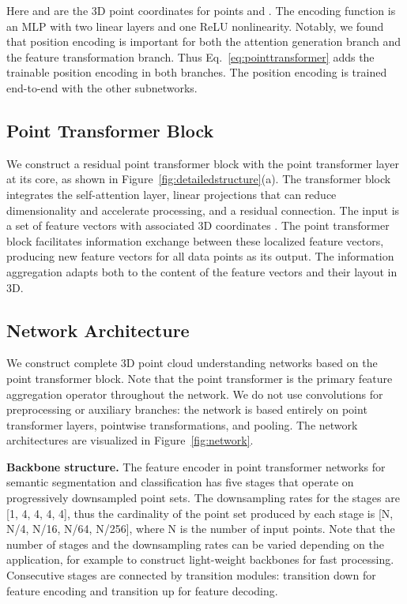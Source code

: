 \documentclass[final]{cvpr}
\newcommand\mypara[1]{\vspace{1mm}\noindent\textbf{#1}}
\begin{document}
Here  and  are the 3D point coordinates for points  and .
The encoding function  is an MLP with two linear layers and one ReLU nonlinearity.
Notably, we found that position encoding is important for both the attention generation branch and the feature transformation branch. Thus Eq.~\ref{eq:pointtransformer} adds the trainable position encoding in both branches. The position encoding  is trained end-to-end with the other subnetworks.

\subsection{Point Transformer Block}

We construct a residual point transformer block with the point transformer layer at its core, as shown in Figure~\ref{fig:detailedstructure}(a). The transformer block integrates the self-attention layer, linear projections that can reduce dimensionality and accelerate processing, and a residual connection. The input is a set of feature vectors  with associated 3D coordinates . The point transformer block facilitates information exchange between these localized feature vectors, producing new feature vectors for all data points as its output.
The information aggregation adapts both to the content of the feature vectors and their layout in 3D.

\subsection{Network Architecture}

We construct complete 3D point cloud understanding networks based on the point transformer block. Note that the point transformer is the primary feature aggregation operator throughout the network. We do not use convolutions for preprocessing or auxiliary branches: the network is based entirely on point transformer layers, pointwise transformations, and pooling.
The network architectures are visualized in Figure~\ref{fig:network}.

\mypara{Backbone structure.}
The feature encoder in point transformer networks for semantic segmentation and classification has five stages that operate on progressively downsampled point sets. The downsampling rates for the stages are [1, 4, 4, 4, 4], thus the cardinality of the point set produced by each stage is [N, N/4, N/16, N/64, N/256], where N is the number of input points.
Note that the number of stages and the downsampling rates can be varied depending on the application, for example to construct light-weight backbones for fast processing.
Consecutive stages are connected by transition modules: transition down for feature encoding and transition up for feature decoding.
\end{document}

